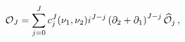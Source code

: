\begin{equation}
{\cal O}_J = \sum_{j = 0}^J c^J_j (\nu_1, \nu_2)
i^{J - j} \left( \partial_2 + \partial_1 \right)^{J - j} \widehat {\cal O}_j
\, ,
\end{equation}

